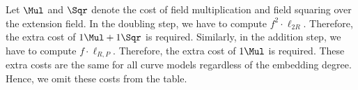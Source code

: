 Let $\Mul$ and $\Sqr$ denote the cost of field multiplication and field squaring over the extension field.
In the doubling step,
we have to compute $f^2 \cdot \ell_{2R}$.
Therefore, the extra cost of $1\Mul + 1\Sqr$ is required.
Similarly, in the addition step,
we have to compute $f \cdot \ell_{R,P}$.
Therefore, the extra cost of $1\Mul$ is required.
These extra costs are the same for all curve models regardless of the embedding degree.
Hence, we omit these costs from the table.



